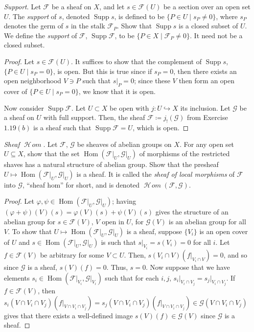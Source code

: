 \documentclass[10pt]{article}
\theoremstyle{definition}
\theoremstyle{remark}
\numberwithin{equation}{section}
\numberwithin{figure}{subsubsection}
\DeclareMathOperator{\Supp}{Supp}
\DeclareMathOperator{\Hom}{Hom}
\DeclareMathOperator{\HHom}{\mathscr{H}\!\mathit{om}}
\begin{document}
\begin{problem}
  \emph{Support}. Let $\mathscr{F}$ be a sheaf on $X$, and let $s \in \mathscr{F}(U)$ be a section over an open set $U$. The \emph{support} of $s$, denoted $\Supp s$, is defined to be $\{P \in U \mid s_P \ne 0\}$, where $s_P$ denotes the germ of $s$ in the stalk $\mathscr{F}_P$. Show that $\Supp s$ is a closed subset of $U$. We define the \emph{support} of $\mathscr{F}$, $\Supp \mathscr{F}$, to be $\{P \in X \mid \mathscr{F}_P \ne 0\}$. It need not be a closed subset.
\end{problem}
\begin{proof}
  Let $s \in \mathscr{F}(U)$. It suffices to show that the complement of $\Supp s$, $\{P \in U \mid s_P = 0\}$, is open. But this is true since if $s_P = 0$, then there exists an open neighborhood $V \ni P$ such that $s\vert_P = 0$; since these $V$ then form an open cover of $\{P \in U \mid s_P = 0\}$, we know that it is open.
  \par Now consider $\Supp\mathscr{F}$. Let $U \subset X$ be open with $j\colon
  U \hookrightarrow X$ its inclusion. Let $\mathscr{G}$ be a sheaf on $U$ with
  full support. Then, the sheaf $\mathscr{F} \coloneqq j_!(\mathscr{G})$ from
  Exercise $1.19(b)$ is a sheaf such that $\Supp\mathscr{F} = U$, which is open.
\end{proof}

\begin{problem}
  \emph{Sheaf $\HHom$}. Let $\mathscr{F}$, $\mathscr{G}$ be sheaves of abelian groups on $X$. For any open set $U \subseteq X$, show that the set $\Hom(\mathscr{F}\vert_U,\mathscr{G}\vert_U)$ of morphisms of the restricted shaves has a natural structure of abelian group. Show that the presheaf $U \mapsto \Hom(\mathscr{F}\vert_U,\mathscr{G}\vert_U)$ is a sheaf. It is called the \emph{sheaf of local morphisms} of $\mathscr{F}$ into $\mathscr{G}$, ``sheaf hom'' for short, and is denoted $\HHom(\mathscr{F},\mathscr{G})$.
\end{problem}
\begin{proof}
  Let $\varphi,\psi \in \Hom(\mathscr{F}\vert_U,\mathscr{G}\vert_U)$; having $(\varphi + \psi)(V)(s) = \varphi(V)(s) + \psi(V)(s)$ gives the structure of an abelian group for $s \in \mathscr{F}(V)$, $V$ open in $U$, for $\mathscr{G}(V)$ is an abelian group for all $V$. To show that $U \mapsto \Hom(\mathscr{F}\vert_U,\mathscr{G}\vert_U)$ is a sheaf, suppose $\{V_i\}$ is an open cover of $U$ and $s \in \Hom(\mathscr{F}\vert_U,\mathscr{G}\vert_U)$ is such that $s\vert_{V_i} = s(V_i) = 0$ for all $i$. Let $f \in \mathscr{F}(V)$ be arbitrary for some $V \subset U$. Then, $s(V_i \cap V)(f\vert_{V_i \cap V}) = 0$, and so since $\mathscr{G}$ is a sheaf, $s(V)(f) = 0$. Thus, $s = 0$. Now suppose that we have elements $s_i \in \Hom(\mathscr{F}\vert_{V_i},\mathscr{G}\vert_{V_i})$ such that for each $i,j$, $s_i\vert_{V_i \cap V_j} = s_j\vert_{V_i \cap V_j}$. If $f \in \mathscr{F}(V)$, then $s_i(V \cap V_i \cap V_j)(f\vert_{V \cap V_i \cap V_j}) = s_j(V \cap V_i \cap V_j)(f\vert_{V \cap V_i \cap V_j}) \in \mathscr{G}(V \cap V_i \cap V_j)$ gives that there exists a well-defined image $s(V)(f) \in \mathscr{G}(V)$ since $\mathscr{G}$ is a sheaf.
\end{proof}
\end{document}
